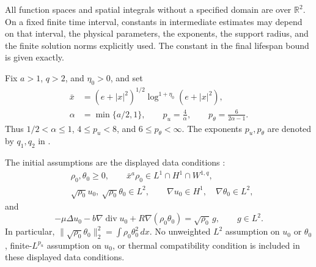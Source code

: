 \documentclass[11pt,letterpaper]{article}
\numberwithin{equation}{section}
\theoremstyle{definition}
\newcommand{\R}{\mathbb R}
\newcommand{\dd}{\,dx}
\newcommand{\Div}{\operatorname{div}}
\newcommand{\norm}[2]{\lVert#1\rVert_{#2}}
\begin{document}
All function spaces and spatial integrals without a specified domain
are over $\R^2$. On a fixed finite time interval, constants in
intermediate estimates may depend on that interval, the physical
parameters, the exponents, the support radius, and the finite solution
norms explicitly used. The constant in the final lifespan bound is
given exactly.

Fix $a>1$, $q>2$, and $\eta_0>0$, and set
\begin{equation}
 \begin{aligned}
 \bar x&=(e+|x|^2)^{1/2}\log^{1+\eta_0}(e+|x|^2),\\
 \alpha&=\min\{a/2,1\},\qquad
 p_u=\frac4\alpha,\qquad
 p_\theta=\frac6{2\alpha-1}.
 \end{aligned}\label{eq:weights}
\end{equation}
Thus $1/2<\alpha\le1$, $4\le p_u<8$, and
$6\le p_\theta<\infty$. The exponents $p_u,p_\theta$ are denoted
by $q_1,q_2$ in \cite[(1.8)]{WangV3}.

The initial assumptions are the displayed data conditions
\cite[(1.5)--(1.6)]{WangV3}:
\begin{equation}
 \begin{aligned}
 &\rho_0,\theta_0\ge0,\qquad
       \bar x^a\rho_0\in L^1\cap H^1\cap W^{1,q},\\
 &\sqrt{\rho_0}u_0,\ \sqrt{\rho_0}\theta_0\in L^2,\qquad
       \nabla u_0\in H^1,\quad \nabla\theta_0\in L^2,
 \end{aligned}\label{eq:data}
\end{equation}
and
\begin{equation}
 -\mu\Delta u_0-b\nabla\Div u_0
       +R\nabla(\rho_0\theta_0)=\sqrt{\rho_0}\,g,
 \qquad g\in L^2.
 \label{eq:compatibility}
\end{equation}
In particular, $\norm{\sqrt{\rho_0}\theta_0}{2}^2
=\int\rho_0\theta_0^2\dd$. No unweighted $L^2$ assumption on
$u_0$ or $\theta_0$, finite-$L^{p_u}$ assumption on $u_0$, or thermal
compatibility condition is included in these displayed data conditions.
\end{document}
